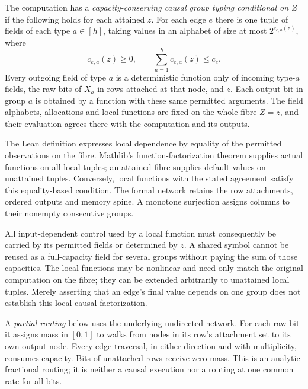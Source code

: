 \begin{definition}\label{def:causal-group-typing}
The computation has a \emph{capacity-conserving causal group typing
conditional on $Z$} if the following holds for each attained $z$.
For each edge $e$ there is one tuple of fields of each type
$a\in[h]$, taking values in an alphabet of size at most
$2^{c_{e,a}(z)}$, where
\[
 c_{e,a}(z)\ge0,\qquad \sum_{a=1}^{h}c_{e,a}(z)\le c_e.
\]
Every outgoing field of type $a$ is a deterministic function only of
incoming type-$a$ fields, the raw bits of $X_a$ in rows attached at that
node, and $z$.  Each output bit in group $a$ is obtained by a function
with these same permitted arguments.  The field alphabets, allocations
and local functions are fixed on the whole fibre $Z=z$, and their
evaluation agrees there with the computation and its outputs.
\end{definition}

The Lean definition expresses local dependence by equality of the
permitted observations on the fibre. Mathlib's function-factorization
theorem supplies actual functions on all local tuples; an attained fibre
supplies default values on unattained tuples. Conversely, local functions
with the stated agreement satisfy this equality-based condition. The
formal network retains the row attachments, ordered outputs and memory
spine. A monotone surjection assigns columns to their nonempty consecutive
groups.

All input-dependent control used by a local function must consequently
be carried by its permitted fields or determined by $z$.  A shared
symbol cannot be reused as a full-capacity field for several groups
without paying the sum of those capacities.  The local functions may be
nonlinear and need only match the original computation on the fibre;
they can be extended arbitrarily to unattained local tuples.  Merely
asserting that an edge's final value depends on one group does not
establish this local causal factorization.

A \emph{partial routing} below uses the underlying undirected network.
For each raw bit it assigns mass in $[0,1]$ to walks from nodes in its
row's attachment set to its own output node.  Every edge traversal,
in either direction and with multiplicity, consumes capacity.  Bits of
unattached rows receive zero mass.  This is an analytic fractional
routing; it is neither a causal execution nor a routing at one common
rate for all bits.

